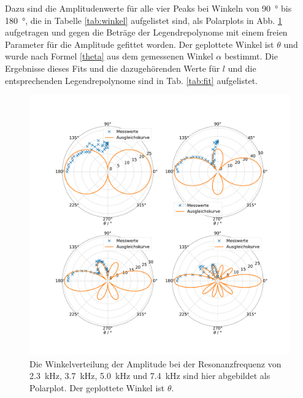 Dazu sind die Amplitudenwerte für alle vier Peaks bei Winkeln von \SI{90}{\degree} bis \SI{180}{\degree}, die in Tabelle \ref{tab:winkel} aufgelistet sind, als Polarplots in Abb. \ref{fig:polar23} aufgetragen und gegen die Beträge der Legendrepolynome mit einem freien Parameter für die Amplitude gefittet worden. Der geplottete Winkel ist $\theta$ und wurde nach Formel \eqref{theta} aus dem gemessenen Winkel $\alpha$ bestimmt.
Die Ergebnisse dieses Fits und die dazugehörenden Werte für $l$ und die entsprechenden Legendrepolynome sind in Tab. \ref{tab:fit} aufgelistet.

\begin{figure}
    \centering
    \includegraphics[width=\textwidth]{plots/C_polar1.pdf}
    \caption{Die Winkelverteilung der Amplitude bei der Resonanzfrequenz von \SI{2.3}{\kilo\hertz}, \SI{3.7}{\kilo\hertz}, \SI{5.0}{\kilo\hertz} und \SI{7.4}{\kilo\hertz} sind hier abgebildet als Polarplot. Der geplottete Winkel ist $\theta$.}
    \label{fig:polar23}
\end{figure}


